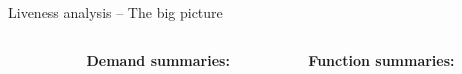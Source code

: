 \documentclass[xcolor=x11names,compress,mathserif]{beamer}
\renewcommand{\(}{\begin{columns}}
\renewcommand{\)}{\end{columns}}
\newcommand{\<}[1]{\begin{column}{#1}}
\renewcommand{\>}{\end{column}}
\begin{document}
\begin{frame}[t]{Liveness analysis -- The big picture}
\begin{columns}[c]
\begin{column}[T]{0.40\textwidth}
 \end{column}
 \begin{column}[T]{0.30\textwidth}
\scriptsize
\centerline{\bf Demand summaries:}
 \end{column}
 \begin{column}[T]{0.38\textwidth}
\scriptsize
\centerline{\bf Function summaries:}
\bigskip{}
 \end{column}
\end{columns}
\end{frame}

\end{document}
